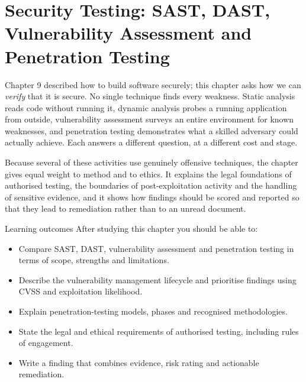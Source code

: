 \chapter{Security Testing: SAST, DAST, Vulnerability Assessment and Penetration Testing}\label{ch:10}

Chapter 9 described how to build software securely; this chapter asks how we can \emph{verify} that it is secure. No single technique finds every weakness. Static analysis reads code without running it, dynamic analysis probes a running application from outside, vulnerability assessment surveys an entire environment for known weaknesses, and penetration testing demonstrates what a skilled adversary could actually achieve. Each answers a different question, at a different cost and stage.

Because several of these activities use genuinely offensive techniques, the chapter gives equal weight to method and to ethics. It explains the legal foundations of authorised testing, the boundaries of post-exploitation activity and the handling of sensitive evidence, and it shows how findings should be scored and reported so that they lead to remediation rather than to an unread document.

\begin{outcomesbox}{Learning outcomes}
After studying this chapter you should be able to:
\begin{itemize}
  \item Compare SAST, DAST, vulnerability assessment and penetration testing in terms of scope, strengths and limitations.
  \item Describe the vulnerability management lifecycle and prioritise findings using CVSS and exploitation likelihood.
  \item Explain penetration-testing models, phases and recognised methodologies.
  \item State the legal and ethical requirements of authorised testing, including rules of engagement.
  \item Write a finding that combines evidence, risk rating and actionable remediation.
\end{itemize}
\end{outcomesbox}

